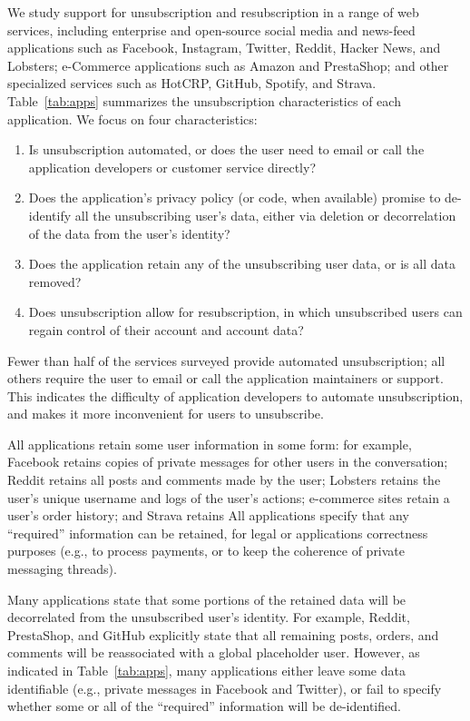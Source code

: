 We study support for unsubscription and resubscription in a range of web
services, including enterprise and open-source social media and news-feed applications such as
Facebook, Instagram, Twitter, Reddit, Hacker News, and Lobsters; e-Commerce applications such as
Amazon and PrestaShop; and other specialized services such as HotCRP, GitHub, Spotify, and Strava.
Table~\ref{tab:apps} summarizes the unsubscription characteristics of each application. We focus on
four characteristics: 
\begin{enumerate}
    \item Is unsubscription automated, or does the user need to email or call the
application developers or customer service directly? 
    \item Does the application's privacy policy (or
        code, when available) promise to de-identify all the unsubscribing user's data, 
        either via deletion or
        decorrelation of the data from the user's identity? 
    \item Does the application retain any of the unsubscribing user data, or is all data removed?
    \item Does unsubscription allow for resubscription, in which unsubscribed users can regain control of their
        account and account data?
\end{enumerate}

Fewer than half of the services surveyed provide automated unsubscription; all others require the
user to email or call the application maintainers or support. This indicates the difficulty of
application developers to automate unsubscription, and makes it more inconvenient for users to
unsubscribe.

All applications retain some user information in some form: for example, Facebook retains copies of
private messages for other users in the conversation; Reddit retains all posts and comments made by
the user; Lobsters retains the user's unique username and logs of the user's actions; e-commerce
sites retain a user's order history; and Strava retains All applications specify that any
``required'' information can be retained, for legal or applications correctness purposes (e.g., to
process payments, or to keep the coherence of private messaging threads).

Many applications state that some portions of the retained data will be decorrelated from the
unsubscribed user's identity. For example, Reddit, PrestaShop, and GitHub explicitly state that all
remaining posts, orders, and comments will be reassociated with a global placeholder user.
However, as indicated in Table~\ref{tab:apps}, many applications either leave some data identifiable
(e.g., private messages in Facebook and Twitter), or fail to specify whether some or all of the ``required''
information will be de-identified.

